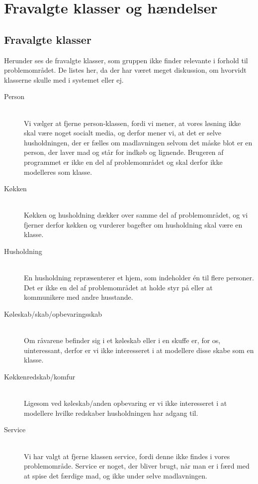 \chapter{Fravalgte klasser og hændelser}
\label{ap:fravalgteklasseroghaendelser}

\section{Fravalgte klasser}
\label{ap:fravalgteklasser}
Herunder ses de fravalgte klasser, som gruppen ikke finder relevante i forhold til problemområdet. De listes her, da der har været meget diskussion, om hvorvidt klasserne skulle med i systemet eller ej. 

\begin{description}
\item[Person] \hfill \\
Vi vælger at fjerne person-klassen, fordi vi mener, at vores løsning ikke skal være noget socialt media, og derfor mener vi, at det er selve husholdningen, der er fælles om madlavningen selvom det måske blot er en person, der laver mad og står for indkøb og lignende. Brugeren af programmet er ikke en del af problemområdet og skal derfor ikke modelleres som klasse.

\item[Køkken] \hfill \\
Køkken og husholdning dækker over samme del af problemområdet, og vi fjerner derfor køkken og vurderer bagefter om husholdning skal være en klasse.

\item[Husholdning] \hfill \\
En husholdning repræsenterer et hjem, som indeholder én til flere personer. Det er ikke en del af problemområdet at holde styr på eller at kommunikere med andre husstande.

\item[Køleskab/skab/opbevaringsskab] \hfill \\
Om råvarene befinder sig i et køleskab eller i en skuffe er, for os, uinteressant, derfor er vi ikke interesseret i at modellere disse skabe som en klasse.

\item[Køkkenredskab/komfur] \hfill \\
Ligesom ved køleskab/anden opbevaring er vi ikke interesseret i at modellere hvilke redskaber husholdningen har adgang til.

\item[Service] \hfill \\ 
Vi har valgt at fjerne klassen service, fordi denne ikke findes i vores problemområde. Service er noget, der bliver brugt, når man er i færd med at spise det færdige mad, og ikke under selve madlavningen.


\end{description}
